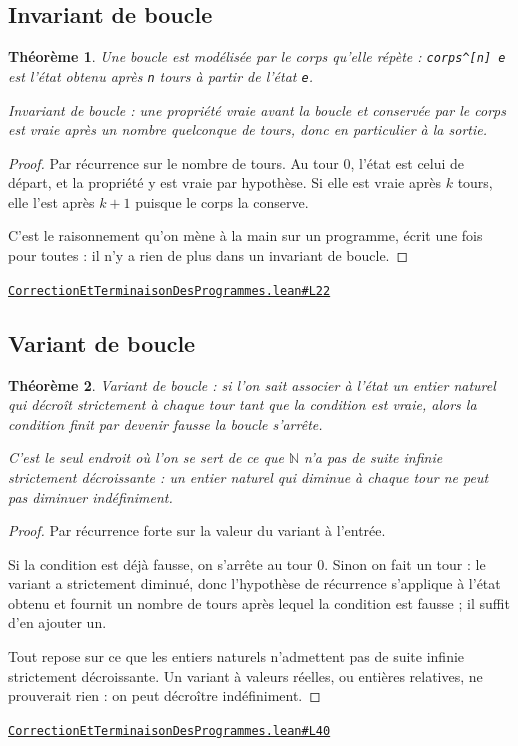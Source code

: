 \documentclass[11pt,a4paper]{article}
\theoremstyle{definition}
\theoremstyle{plain}
\newtheorem{theoreme}{Théorème}
\newcommand{\source}[2]{\par\smallskip\noindent\hfill{\footnotesize\href{#1}{\texttt{#2}}}\par\smallskip}
\begin{document}
\subsection{Invariant de boucle}

\begin{theoreme}
Une boucle est modélisée par le corps qu'elle répète : \texttt{corps\textasciicircum{}[n] e} est l'état
obtenu après \texttt{n} tours à partir de l'état \texttt{e}.

Invariant de boucle : une propriété vraie avant la boucle et conservée par le corps
est vraie après un nombre quelconque de tours, donc en particulier à la sortie.
\end{theoreme}
\begin{proof}
Par récurrence sur le nombre de tours. Au tour \(0\), l'état est celui de départ, et la
propriété y est vraie par hypothèse. Si elle est vraie après \(k\) tours, elle l'est
après \(k+1\) puisque le corps la conserve.

C'est le raisonnement qu'on mène à la main sur un programme, écrit une fois pour
toutes : il n'y a rien de plus dans un invariant de boucle.
\end{proof}
\source{https://github.com/Commutator-IO/learn-lean/blob/main/courses/02-lycee/11-informatique-nsi/CorrectionEtTerminaisonDesProgrammes.lean\#L22}{CorrectionEtTerminaisonDesProgrammes.lean\#L22}

\subsection{Variant de boucle}

\begin{theoreme}
Variant de boucle : si l'on sait associer à l'état un entier naturel qui décroît
strictement à chaque tour tant que la condition est vraie, alors la condition finit
par devenir fausse \textemdash{} la boucle s'arrête.

C'est le seul endroit où l'on se sert de ce que \(\mathbb{N}\) n'a pas de suite infinie
strictement décroissante : un entier naturel qui diminue à chaque tour ne peut pas
diminuer indéfiniment.
\end{theoreme}
\begin{proof}
Par récurrence forte sur la valeur du variant à l'entrée.

Si la condition est déjà fausse, on s'arrête au tour \(0\). Sinon on fait un tour : le
variant a strictement diminué, donc l'hypothèse de récurrence s'applique à l'état
obtenu et fournit un nombre de tours après lequel la condition est fausse ; il suffit
d'en ajouter un.

Tout repose sur ce que les entiers naturels n'admettent pas de suite infinie
strictement décroissante. Un variant à valeurs réelles, ou entières relatives, ne
prouverait rien : on peut décroître indéfiniment.
\end{proof}
\source{https://github.com/Commutator-IO/learn-lean/blob/main/courses/02-lycee/11-informatique-nsi/CorrectionEtTerminaisonDesProgrammes.lean\#L40}{CorrectionEtTerminaisonDesProgrammes.lean\#L40}
\end{document}
